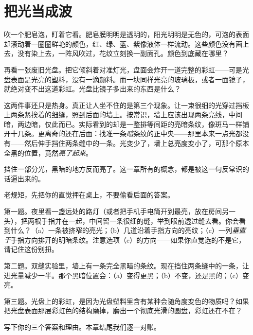 \chapter{把光当成波}


\begin{mainline}
吹一个肥皂泡，盯着它看。肥皂膜明明是透明的，阳光明明是无色的，可泡的表面却滚动着一圈圈鲜艳的颜色，红、绿、蓝、紫像液体一样流动。这些颜色没有画上去，没有染上去，一阵风吹过，花纹立刻换一副面孔。颜色到底藏在哪里？

再看一张废旧光盘。把它倾斜着对准灯光，盘面会炸开一道完整的彩虹——可是光盘表面是光亮的塑料，没有一滴颜料。而一块同样光亮的玻璃板，或者一面镜子，就绝对变不出这道彩虹。光盘比镜子多出来的东西是什么？

这两件事还只是热身。真正让人坐不住的是第三个现象。让一束很细的光穿过挡板上两条紧挨着的细缝，照到后面的墙上。按常识，墙上应该出现两条亮线，中间暗，两边暗，仅此而已。实际看到的却是一整排等间距的亮暗条纹，像斑马一样铺开十几条。更离奇的还在后面：找准一条\emph{暗}条纹的正中央——那里本来一点光都没有——然后伸手挡住两条缝中的一条。光变少了，墙上总亮度变小了，可那个原本全黑的位置，竟然\emph{亮了起来}。

挡住一部分光，黑暗的地方反而亮了。这一章所有的概念，都是被这一句反常识的话逼出来的。
\end{mainline}


老规矩，先把你的直觉押在桌上，不要偷看后面的答案。

第一题。夜里看一盏远处的路灯（或者把手机手电筒开到最亮，放在房间另一头），把两根手指并在一起，中间留一条很细的缝，举到眼前透过缝去看。你会看到什么？（a）一条被挤窄的亮光；（b）几道沿着手指方向的亮纹；（c）一列\emph{垂直于}手指方向排开的明暗条纹。注意选项（c）的方向——如果你直觉选的不是它，请记住这份别扭。

第二题。双缝实验里，墙上有一条完全黑暗的条纹。现在挡住两条缝中的一条，让进光量减少一半。那个黑暗位置会：（a）变得更黑；（b）不变，还是黑的；（c）变亮。

第三题。光盘上的彩虹，是因为光盘塑料里含有某种会随角度变色的物质吗？如果把光盘表面那层彩虹色的结构磨掉，磨出一个彻底光滑的圆盘，彩虹还在不在？

写下你的三个答案和理由。本章结尾我们逐一对账。


